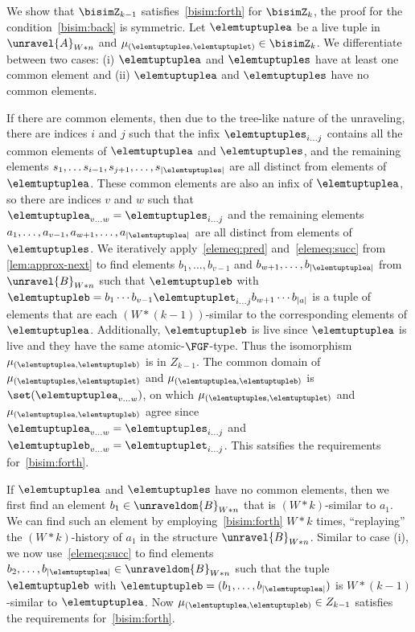 \begin{proofsketch}
  We show that $\bisimZ_{k-1}$ satisfies~\ref{bisim:forth} for $\bisimZ_{k}$, the proof for the condition~\ref{bisim:back} is symmetric.
  Let $\elemtuptuplea$ be a live tuple in $\unravel{A}_{W * n}$ and $\mu_{(\elemtuptuples, \elemtuptuplet)} \in \bisimZ_{k}$.
  We differentiate between two cases: (i) $\elemtuptuplea$ and $\elemtuptuples$ have at least one common element and (ii) $\elemtuptuplea$ and $\elemtuptuples$ have no common elements.
  \begin{romanenumerate}
    \item
    If there are common elements, then due to the tree-like nature of the unraveling, there are indices $i$ and $j$ such that the infix $\elemtuptuples_{i\ldots{}j}$ contains all the common elements of $\elemtuptuplea$ and $\elemtuptuples$, and the remaining elements $s_{1}, \ldots s_{i-1}, s_{j+1}, \ldots, s_{|\elemtuptuples|}$ are all distinct from elements of $\elemtuptuplea$.
    These common elements are also an infix of $\elemtuptuplea$, so there are indices $v$ and $w$ such that $\elemtuptuplea_{v\ldots{}w} = \elemtuptuples_{i\ldots{}j}$ and the remaining elements $a_1, \ldots, a_{v-1}, a_{w+1}, \ldots, a_{|\elemtuptuplea|}$ are all distinct from elements of $\elemtuptuples$.
    We iteratively apply~\ref{elemeq:pred} and~\ref{elemeq:succ} from \cref{lem:approx-next} to find elements $b_{1}, \ldots, b_{v-1}$ and $b_{w+1}, \ldots, b_{|\elemtuptuplea|}$ from $\unravel{B}_{W * n}$ such that $\elemtuptupleb$ with $\elemtuptupleb = b_{1}\cdots{}b_{v-1}\elemtuptuplet_{i\ldots{}j}b_{w+1}\cdots{}b_{|a|}$ is a tuple of elements that are each $(W*(k-1))$-similar to the corresponding elements of $\elemtuptuplea$.
    Additionally, $\elemtuptupleb$ is live since $\elemtuptuplea$ is live and they have the same atomic-$\FGF$-type.
    Thus the isomorphism $\mu_{(\elemtuptuplea,\elemtuptupleb)}$ is in $Z_{k-1}$.
    The common domain of $\mu_{(\elemtuptuples,\elemtuptuplet)}$ and $\mu_{(\elemtuptuplea,\elemtuptupleb)}$ is $\set(\elemtuptuplea_{v\ldots{}w})$, on which $\mu_{(\elemtuptuples,\elemtuptuplet)}$ and $\mu_{(\elemtuptuplea,\elemtuptupleb)}$ agree since $\elemtuptuplea_{v\ldots{}w} = \elemtuptuples_{i\ldots{}j}$ and $\elemtuptupleb_{v\ldots{}w} = \elemtuptuplet_{i\ldots{}j}$.
    This satsifies the requirements for~\ref{bisim:forth}.

    \item
    If $\elemtuptuplea$ and $\elemtuptuples$ have no common elements, then we first find an element $b_{1} \in \unraveldom{B}_{W * n}$ that is $(W * k)$-similar to $a_{1}$.
    We can find such an element by employing~\ref{bisim:forth} $W * k$ times, ``replaying'' the $(W*k)$-history of $a_{1}$ in the structure $\unravel{B}_{W * n}$.
    Similar to case (i), we now use~\ref{elemeq:succ} to find elements $b_{2}, \ldots, b_{|\elemtuptuplea|} \in \unraveldom{B}_{W * n}$ such that the tuple $\elemtuptupleb$ with $\elemtuptupleb = (b_{1}, \ldots, b_{|\elemtuptuplea|})$ is $W * (k - 1)$-similar to $\elemtuptuplea$.
    Now $\mu_{(\elemtuptuplea, \elemtuptupleb)} \in Z_{k-1}$ satisfies the requirements for~\ref{bisim:forth}.
  \end{romanenumerate}
\end{proofsketch}
